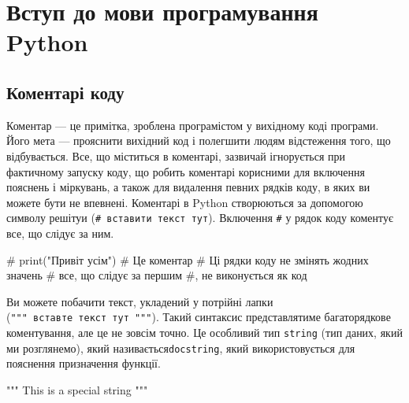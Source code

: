 \documentclass[
  letterpaper,
]{report}
\newenvironment{Shaded}{\begin{snugshade}}{\end{snugshade}}
\newcommand{\CommentTok}[1]{\textcolor[rgb]{0.37,0.37,0.37}{#1}}
\begin{document}
\hypertarget{ux432ux441ux442ux443ux43f-ux434ux43e-ux43cux43eux432ux438-ux43fux440ux43eux433ux440ux430ux43cux443ux432ux430ux43dux43dux44f-python}{%
\chapter{Вступ до мови програмування
Python}\label{ux432ux441ux442ux443ux43f-ux434ux43e-ux43cux43eux432ux438-ux43fux440ux43eux433ux440ux430ux43cux443ux432ux430ux43dux43dux44f-python}}

\hypertarget{ux43aux43eux43cux435ux43dux442ux430ux440ux456-ux43aux43eux434ux443}{%
\section{Коментарі
коду}\label{ux43aux43eux43cux435ux43dux442ux430ux440ux456-ux43aux43eux434ux443}}

Коментар --- це примітка, зроблена програмістом у вихідному коді
програми. Його мета --- прояснити вихідний код і полегшити людям
відстеження того, що відбувається. Все, що міститься в коментарі,
зазвичай ігнорується при фактичному запуску коду, що робить коментарі
корисними для включення пояснень і міркувань, а також для видалення
певних рядків коду, в яких ви можете бути не впевнені. Коментарі в
Python створюються за допомогою символу решітуи
(\texttt{\#\ вставити\ текст\ тут}). Включення \texttt{\#} у рядок коду
коментує все, що слідує за ним.

\begin{Shaded}
\begin{Highlighting}[]
\CommentTok{\# print("Привіт усім")}
\CommentTok{\# Це коментар}
\CommentTok{\# Ці рядки коду не змінять жодних значень}
\CommentTok{\# все, що слідує за першим \#, не виконується як код}
\end{Highlighting}
\end{Shaded}

Ви можете побачити текст, укладений у потрійні лапки
(\texttt{"""\ вставте\ текст\ тут\ """}). Такий синтаксис представлятиме
багаторядкове коментування, але це не зовсім точно. Це особливий тип
\texttt{string} (тип даних, який ми розглянемо), який
називається\texttt{docstring}, який використовується для пояснення
призначення функції.

\begin{Shaded}
\begin{Highlighting}[]
\CommentTok{""" This is a special string """}
\end{Highlighting}
\end{Shaded}
\end{document}
